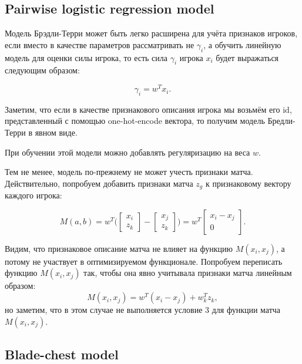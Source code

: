 \documentclass[12pt,a4paper]{article}
\begin{document}
\subsection{Pairwise logistic regression model}

Модель Брэдли-Терри может быть легко расширена для учёта признаков игроков, если вместо в качестве параметров рассматривать не $\gamma_i$, а обучить линейную модель для оценки силы игрока, то есть сила $\gamma_i$ игрока $x_i$ будет выражаться следующим образом:

\begin{equation*}
	\gamma_i = w^T x_i.
\end{equation*}

Заметим, что если в качестве признакового описания игрока мы возьмём его id, представленный с помощью one-hot-encode вектора, то получим модель Бредли-Терри в явном виде.

При обучении этой модели можно добавлять регуляризацию на веса $w$.

Тем не менее, модель по-прежнему не может учесть признаки матча. Действительно, попробуем добавить признаки матча $z_g$ к признаковому вектору каждого игрока:

\begin{equation*}
	M(a,b) = w^T\bigg(
	\begin{bmatrix}
	x_i\\
	z_k
	\end{bmatrix}
	-
	\begin{bmatrix}
	x_j\\
	z_k
	\end{bmatrix}
	 \bigg)
	= 
	w^T
	\begin{bmatrix}
	x_i - x_j\\
	0
	\end{bmatrix}.
\end{equation*}

Видим, что признаковое описание матча не влияет на функцию $M(x_i, x_j)$, а потому не участвует в оптимизируемом функционале. Попробуем переписать функцию $M(x_i, x_j)$ так, чтобы она явно учитывала признаки матча линейным образом: 
$$M(x_i, x_j) = w^T(x_i - x_j) + w_k^T z_k,$$
но заметим, что в этом случае не выполняется условие 3 для функции матча~$M(x_i, x_j)$.

\subsection{Blade-chest model}
\end{document}
